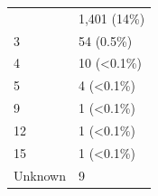 \documentclass[]{article}
\begin{document}
\begin{longtable}[]{@{}ll@{}}
\begin{minipage}[t]{0.71\columnwidth}
\end{minipage} & \begin{minipage}[t]{0.23\columnwidth}\raggedright
1,401 (14\%)\strut
\end{minipage}\tabularnewline
\begin{minipage}[t]{0.71\columnwidth}\raggedright
3\strut
\end{minipage} & \begin{minipage}[t]{0.23\columnwidth}\raggedright
54 (0.5\%)\strut
\end{minipage}\tabularnewline
\begin{minipage}[t]{0.71\columnwidth}\raggedright
4\strut
\end{minipage} & \begin{minipage}[t]{0.23\columnwidth}\raggedright
10 (\textless0.1\%)\strut
\end{minipage}\tabularnewline
\begin{minipage}[t]{0.71\columnwidth}\raggedright
5\strut
\end{minipage} & \begin{minipage}[t]{0.23\columnwidth}\raggedright
4 (\textless0.1\%)\strut
\end{minipage}\tabularnewline
\begin{minipage}[t]{0.71\columnwidth}\raggedright
9\strut
\end{minipage} & \begin{minipage}[t]{0.23\columnwidth}\raggedright
1 (\textless0.1\%)\strut
\end{minipage}\tabularnewline
\begin{minipage}[t]{0.71\columnwidth}\raggedright
12\strut
\end{minipage} & \begin{minipage}[t]{0.23\columnwidth}\raggedright
1 (\textless0.1\%)\strut
\end{minipage}\tabularnewline
\begin{minipage}[t]{0.71\columnwidth}\raggedright
15\strut
\end{minipage} & \begin{minipage}[t]{0.23\columnwidth}\raggedright
1 (\textless0.1\%)\strut
\end{minipage}\tabularnewline
\begin{minipage}[t]{0.71\columnwidth}\raggedright
Unknown\strut
\end{minipage} & \begin{minipage}[t]{0.23\columnwidth}\raggedright
9\strut
\end{minipage}\tabularnewline

\end{longtable}
\end{document}
